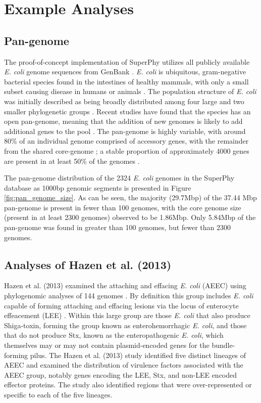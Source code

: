 \documentclass[doublespacing, linenumbers]{bmcart}
\begin{document}
\section{Example Analyses}
\subsection{Pan-genome}
The proof-of-concept implementation of SuperPhy utilizes all publicly available \textit{E. coli} genome sequences from GenBank \cite{benson_genbank_2012}. \textit{E. coli} is ubiquitous, gram-negative bacterial species found in the intestines of healthy mammals, with only a small subset causing disease in humans or animals \cite{tenaillon_population_2010}. The population structure of \textit{E. coli} was initially described as being broadly distributed among four large and two smaller phylogenetic groups \cite{selander_methods_1986,goullet_comparative_1989}. Recent studies have found that the species has an open pan-genome, meaning that the addition of new genomes is likely to add additional genes to the pool \cite{medini_microbial_2005}. The pan-genome is highly variable, with around 80\% of an individual genome comprised of accessory genes, with the remainder from the shared core-genome \cite{lukjancenko_comparison_2010}; a stable proportion of approximately 4000 genes are present in at least 50\% of the genomes \cite{gordienko_evolution_2013}.

The pan-genome distribution of the 2324 \textit{E. coli} genomes in the SuperPhy database as 1000bp genomic segments is presented in Figure \ref{fig:pan_genome_size}. As can be seen, the majority (29.7Mbp) of the 37.44 Mbp pan-genome is present in fewer than 100 genomes, with the core genome size (present in at least 2300 genomes) observed to be 1.86Mbp. Only 5.84Mbp of the pan-genome was found in greater than 100 genomes, but fewer than 2300 genomes.

\subsection{Analyses of Hazen et al. (2013)}
Hazen et al. (2013) examined the attaching and effacing \textit{E. coli} (AEEC) using phylogenomic analyses of 144 genomes \cite{hazen_refining_2013}. By definition this group includes \textit{E. coli} capable of forming attaching and effacing lesions via the locus of enterocyte effeacement (LEE) \cite{croxen_recent_2013}. Within this large group are those \textit{E. coli} that also produce Shiga-toxin, forming the group known as enterohemorrhagic \textit{E. coli}, and those that do not produce Stx, known as  the enteropathogenic \textit{E. coli}, which themselves may or may not contain plasmid-encoded genes for the bundle-forming pilus.  The Hazen et al. (2013) study identified five distinct lineages of AEEC and examined the distribution of virulence factors associated with the AEEC group, notably genes encoding the LEE, Stx, and non-LEE encoded effector proteins. The study also identified regions that were over-represented or specific to each of the five lineages.
\end{document}

